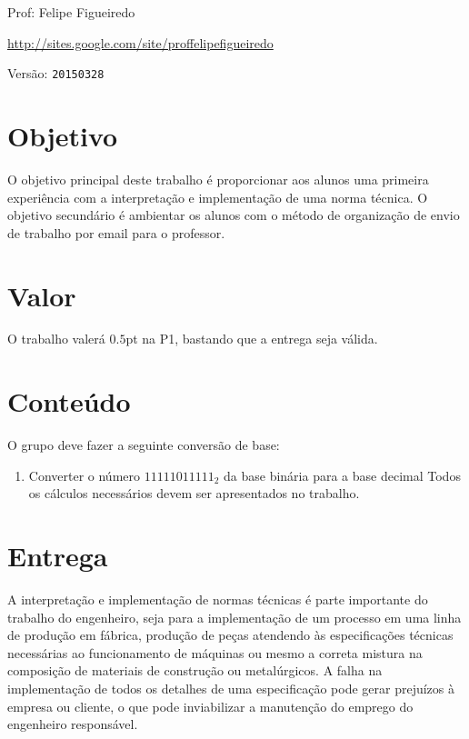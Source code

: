 \documentclass[a4paper]{article}
\begin{document}
\parbox[c]{.825\textwidth}{\raggedright%
{Prof: Felipe Figueiredo\par}
{\url{http://sites.google.com/site/proffelipefigueiredo}\par}
}

Versão: \verb|20150328|



\section{Objetivo}
O objetivo principal deste trabalho é proporcionar aos alunos uma
primeira experiência com a interpretação e implementação de uma norma
técnica. O objetivo secundário é ambientar os alunos com o método de
organização de envio de trabalho por email para o professor.

\section{Valor}
O trabalho valerá $0.5$pt na P1, bastando que a entrega seja válida.

\section{Conteúdo}
O grupo deve fazer a seguinte conversão de base:
 
\begin{enumerate}
\item Converter o número $11111011111_2$ da base binária para a base
  decimal Todos os cálculos necessários devem ser apresentados no
  trabalho.
\end{enumerate}

\section{Entrega}
A interpretação e implementação de normas técnicas é parte importante
do trabalho do engenheiro, seja para a implementação de um processo em
uma linha de produção em fábrica, produção de peças atendendo às
especificações técnicas necessárias ao funcionamento de máquinas ou
mesmo a correta mistura na composição de materiais de construção ou
metalúrgicos. A falha na implementação de todos os detalhes de uma
especificação pode gerar prejuízos à empresa ou cliente, o que pode
inviabilizar a manutenção do emprego do engenheiro responsável.
\end{document}
